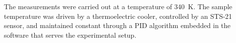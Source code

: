 \documentclass{WileyMSP-template}
\begin{document}
The measurements were carried out at a temperature of 340~K.
The sample temperature was driven by a thermoelectric cooler,
controlled by an STS-21 sensor,
and maintained constant through a PID algorithm embedded in the software that serves the experimental setup.



%
\end{document}
